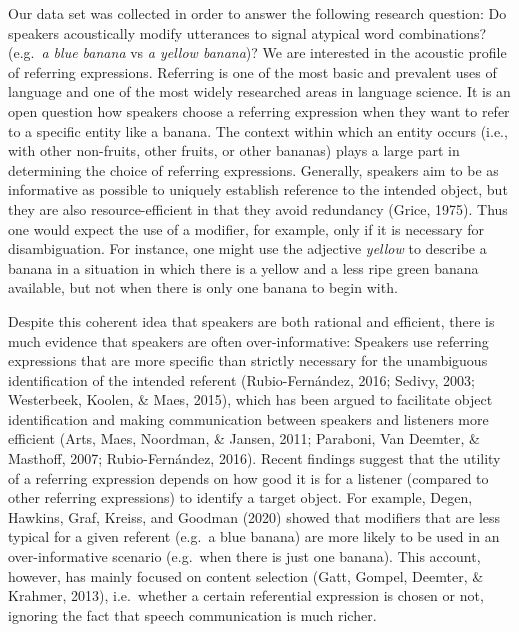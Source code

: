 \documentclass[
  english,
  man,floatsintext]{apa6}
\begin{document}
Our data set was collected in order to answer the following research question: Do speakers acoustically modify utterances to signal atypical word combinations? (e.g.~\emph{a blue banana} vs \emph{a yellow banana})?
We are interested in the acoustic profile of referring expressions.
Referring is one of the most basic and prevalent uses of language and one of the most widely researched areas in language science.
It is an open question how speakers choose a referring expression when they want to refer to a specific entity like a banana.
The context within which an entity occurs (i.e., with other non-fruits, other fruits, or other bananas) plays a large part in determining the choice of referring expressions.
Generally, speakers aim to be as informative as possible to uniquely establish reference to the intended object, but they are also resource-efficient in that they avoid redundancy (Grice, 1975).
Thus one would expect the use of a modifier, for example, only if it is necessary for disambiguation.
For instance, one might use the adjective \emph{yellow} to describe a banana in a situation in which there is a yellow and a less ripe green banana available, but not when there is only one banana to begin with.

Despite this coherent idea that speakers are both rational and efficient, there is much evidence that speakers are often over-informative: Speakers use referring expressions that are more specific than strictly necessary for the unambiguous identification of the intended referent (Rubio-Fernández, 2016; Sedivy, 2003; Westerbeek, Koolen, \& Maes, 2015), which has been argued to facilitate object identification and making communication between speakers and listeners more efficient (Arts, Maes, Noordman, \& Jansen, 2011; Paraboni, Van Deemter, \& Masthoff, 2007; Rubio-Fernández, 2016).
Recent findings suggest that the utility of a referring expression depends on how good it is for a listener (compared to other referring expressions) to identify a target object.
For example, Degen, Hawkins, Graf, Kreiss, and Goodman (2020) showed that modifiers that are less typical for a given referent (e.g.~a blue banana) are more likely to be used in an over-informative scenario (e.g.~when there is just one banana).
This account, however, has mainly focused on content selection (Gatt, Gompel, Deemter, \& Krahmer, 2013), i.e.~whether a certain referential expression is chosen or not, ignoring the fact that speech communication is much richer.
\end{document}

